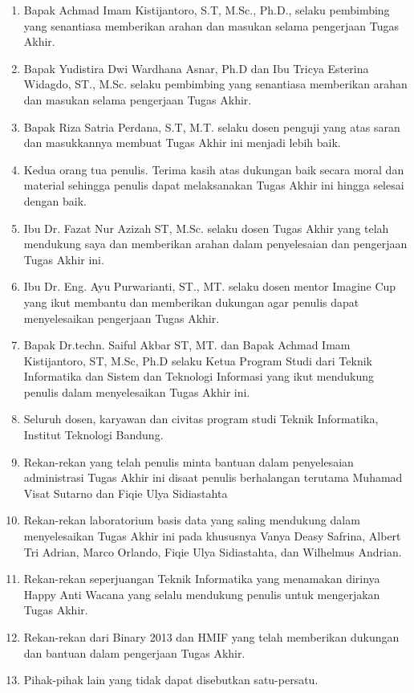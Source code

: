 \begin{enumerate}
	\item Bapak Achmad Imam Kistijantoro, S.T, M.Sc., Ph.D., selaku pembimbing yang senantiasa memberikan arahan dan masukan selama pengerjaan Tugas Akhir.
	\item Bapak Yudistira Dwi Wardhana Asnar, Ph.D dan Ibu Tricya Esterina Widagdo, ST., M.Sc. selaku pembimbing yang senantiasa memberikan arahan dan masukan selama pengerjaan Tugas Akhir.
	\item Bapak Riza Satria Perdana, S.T, M.T. selaku dosen penguji yang atas saran dan masukkannya membuat Tugas Akhir ini menjadi lebih baik.
	\item Kedua orang tua penulis. Terima kasih atas dukungan baik secara moral dan material sehingga penulis dapat melaksanakan Tugas Akhir ini hingga selesai dengan baik.
	\item Ibu Dr. Fazat Nur Azizah ST, M.Sc. selaku dosen Tugas Akhir yang telah mendukung saya dan memberikan arahan dalam penyelesaian dan pengerjaan Tugas Akhir ini.
	\item Ibu Dr. Eng. Ayu Purwarianti, ST., MT. selaku dosen mentor Imagine Cup yang ikut membantu dan memberikan dukungan agar penulis dapat menyelesaikan pengerjaan Tugas Akhir.
	\item Bapak Dr.techn. Saiful Akbar ST, MT. dan Bapak Achmad Imam Kistijantoro, ST, M.Sc, Ph.D selaku Ketua Program Studi dari Teknik Informatika dan Sistem dan Teknologi Informasi yang ikut mendukung penulis dalam menyelesaikan Tugas Akhir ini.
	\item Seluruh dosen, karyawan dan civitas program studi Teknik Informatika, Institut Teknologi Bandung.
	\item Rekan-rekan yang telah penulis minta bantuan dalam penyelesaian administrasi Tugas Akhir ini disaat penulis berhalangan terutama Muhamad Visat Sutarno dan Fiqie Ulya Sidiastahta
	\item Rekan-rekan laboratorium basis data yang saling mendukung dalam menyelesaikan Tugas Akhir ini pada khususnya Vanya Deasy Safrina, Albert Tri Adrian, Marco Orlando, Fiqie Ulya Sidiastahta, dan Wilhelmus Andrian.
	\item Rekan-rekan seperjuangan Teknik Informatika yang menamakan dirinya Happy Anti Wacana yang selalu mendukung penulis untuk mengerjakan Tugas Akhir.
	\item Rekan-rekan dari Binary 2013 dan HMIF yang telah memberikan dukungan dan bantuan dalam pengerjaan Tugas Akhir.
	\item Pihak-pihak lain yang tidak dapat disebutkan satu-persatu.
\end{enumerate}

